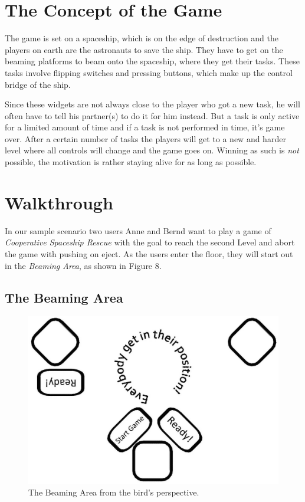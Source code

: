 \documentclass{sigchi}
\begin{document}
\section{The Concept of the Game}
\vspace{1mm}
The game is set on a spaceship, which is on the edge of destruction and the players on earth are the astronauts to save the ship. They have to get on the beaming platforms to beam onto the spaceship, where they get their tasks. These tasks involve flipping switches and pressing buttons, which make up the control bridge of the ship. 

Since these widgets are not always close to the player who got a new task, he will often have to tell his partner(s) to do it for him instead. But a task is only active for a limited amount of time and if a task is not performed in time, it's game over. \newline
After a certain number of tasks the players will get to a new and harder level where all controls will change and the game goes on. Winning as such is \textit{not} possible, the motivation is rather staying alive for as long as possible.
\section{Walkthrough}
\vspace{1mm}
In our sample scenario two users Anne and Bernd want to play a game of \textit{Cooperative Spaceship Rescue} with the goal to reach the second Level and abort the game with pushing on eject. As the users enter the floor, they will start out in the \textit{Beaming Area}, as shown in Figure 8.

\subsection{The Beaming Area}
\vspace{3mm}

\begin{figure}[h]
\centering
\includegraphics[width=0.8\columnwidth]{beamingArea}
\caption{The Beaming Area from the bird's perspective.}
\label{fig:beamingArea}
\end{figure}
\end{document}
